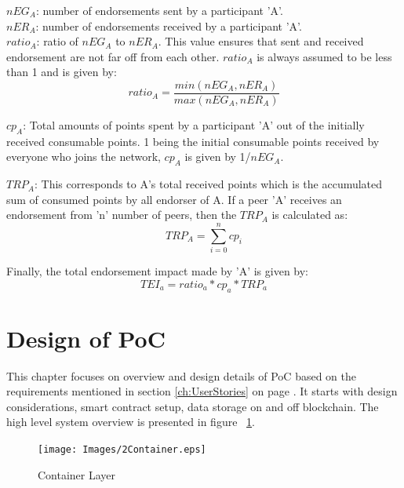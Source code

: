 \textit{$nEG_A$}: number of endorsements sent by a participant 'A'. \\

\textit{$nER_A$}: number of endorsements received by a participant 'A'. \\

\textit{$ratio_A$}: ratio of \textit{$nEG_A$} to \textit{$nER_A$}. This value
ensures that sent and received endorsement are not far off from  each other.
\textit{$ratio_A$} is always assumed to be less than 1 and is given by: 
\begin{equation}
	ratio_A = \frac{min(nEG_A,nER_A)}{max(nEG_A,nER_A)} 
\end{equation}

\textit{$cp_A$}: Total amounts of points spent by a participant 'A' out of the
initially received consumable points. 1 being the initial consumable points
received by everyone who joins the network, \textit{$cp_A$} is given by
1/\textit{$nEG_A$}.

\textit{$TRP_A$}: This corresponds to A's total received points which is the
accumulated sum of consumed points by all endorser of A.  If a peer 'A'
receives an endorsement from 'n' number of peers, then the \textit{$TRP_A$} is
calculated as:
\begin{equation}
	TRP_A  = \sum_{i=0}^{n}cp_{i}
\end{equation}

Finally, the total endorsement impact made by 'A' is given by: \\
\begin{equation}
	TEI_a = ratio_a * cp_a * TRP_a
\end{equation}

%

\section{Design of PoC}
This chapter focuses on overview and design details of PoC based on the
requirements mentioned in section \ref{ch:UserStories} on page
\pageref{ch:UserStories}. It starts with design considerations, smart contract
setup, data storage on and off blockchain. The high level system overview is
presented in figure ~\ref{fig:SystemContainer}. 

\begin{figure}
	\texttt{[image: Images/2Container.eps]}
	\caption{Container Layer}
	\label{fig:SystemContainer}
\end{figure}

